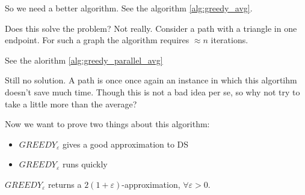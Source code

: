     So we need a better algorithm. See the algorithm \ref{alg:greedy_avg}.

    

    Does this solve the problem? Not really.
    Consider a path with a triangle in one endpoint. For such a graph the algorithm requires $\approx n$ iterations.

    See the alorithm \ref{alg:greedy_parallel_avg}

    

    Still no solution. A path is once once again an instance in which this algortihm doesn't save much time.
    Though this is not a bad idea per se, so why not try to take a little more than the average?

    

    Now we want to prove two things about this algorithm:
    \begin{itemize}
        \item $GREEDY_\varepsilon$ gives a good approximation to DS
        \item $GREEDY_\varepsilon$ runs quickly
    \end{itemize}

    \begin{lemma}
        $GREEDY_\varepsilon$ returns a $2(1+\varepsilon)$-approximation, $\forall \varepsilon > 0$.
    \end{lemma}

